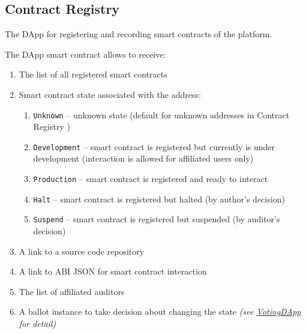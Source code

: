 \documentclass[12pt]{report}
\newcommand{\hlc}[1]{\colorbox{yellow!25}{#1}}
\def\code#1{\colorbox{light-gray}{\texttt{#1}}}
\begin{document}
\subsection{Contract Registry}
\label{tech-apps-contracts-registry}
\begin{multicols}{2}
The DApp for registering and recording smart contracts of the platform.

The DApp smart contract allows to receive:
\begin{enumerate}
	\item The list of all registered smart contracts
	\item Smart contract state associated with the address:
	\begin{enumerate}
		\item \code{Unknown} – unknown state (default for unknown addresses in \hlc{Contract Registry })
		\item \code{Development} – smart contract is registered but currently is under development (interaction is allowed for affiliated users only)
		\item \code{Production} – smart contract is registered and \hlc{ready to interact}
		\item \code{Halt} – smart contract is registered but halted (by author's decision)
		\item \code{Suspend} – smart contract is registered but suspended (by auditor's decision)
	\end{enumerate}
\item A link to a source code repository
\item A link to ABI JSON for smart contract interaction
\item The list of affiliated auditors
\item A ballot \hlc{instance} to take decision about changing the state \textit{(see \hyperref[tech-apps-voting]{VotingDApp} for detail)}
\end{enumerate}
\end{multicols}
\end{document}
